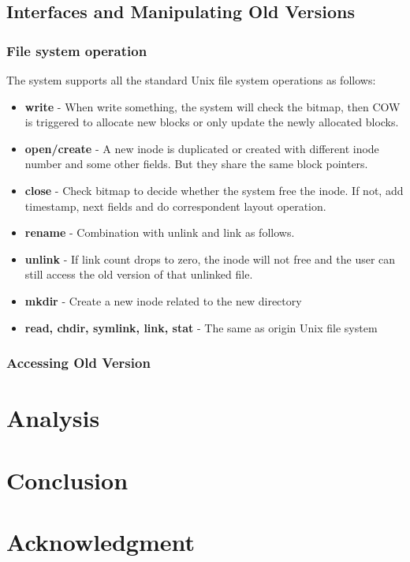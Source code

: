 \subsection{Interfaces and Manipulating Old Versions}
\subsubsection{File system operation}
The system supports all the standard Unix file system operations as follows:
\begin{itemize}
\item \textbf{write} - When write something, the system will check the bitmap, then COW is triggered to allocate new blocks or only update the newly allocated blocks.
\item \textbf{open/create} - A new inode is duplicated or created with different inode number and some other fields. But they share the same block pointers.
\item \textbf{close} - Check bitmap to decide whether the system free the inode. If not, add timestamp, next fields and do correspondent layout operation.
\item \textbf{rename} - Combination with unlink and link as follows.
\item \textbf{unlink} - If link count drops to zero, the inode will not free and the user can still access the old version of that unlinked file.
\item \textbf{mkdir} - Create a new inode related to the new directory
\item \textbf{read, chdir, symlink, link, stat} - The same as origin Unix file system
\end{itemize}
\subsubsection{Accessing Old Version}

\section{Analysis}
\section{Conclusion}
\section{Acknowledgment}
